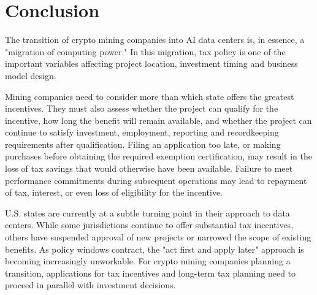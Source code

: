 \section{Conclusion}

The transition of crypto mining companies into AI data centers is, in essence, a "migration of computing power." In this migration, tax policy is one of the important variables affecting project location, investment timing and business model design.

Mining companies need to consider more than which state offers the greatest incentives. They must also assess whether the project can qualify for the incentive, how long the benefit will remain available, and whether the project can continue to satisfy investment, employment, reporting and recordkeeping requirements after qualification. Filing an application too late, or making purchases before obtaining the required exemption certification, may result in the loss of tax savings that would otherwise have been available. Failure to meet performance commitments during subsequent operations may lead to repayment of tax, interest, or even loss of eligibility for the incentive.

U.S. states are currently at a subtle turning point in their approach to data centers. While some jurisdictions continue to offer substantial tax incentives, others have suspended approval of new projects or narrowed the scope of existing benefits. As policy windows contract, the "act first and apply later" approach is becoming increasingly unworkable. For crypto mining companies planning a transition, applications for tax incentives and long-term tax planning need to proceed in parallel with investment decisions.

\FloatBarrier
